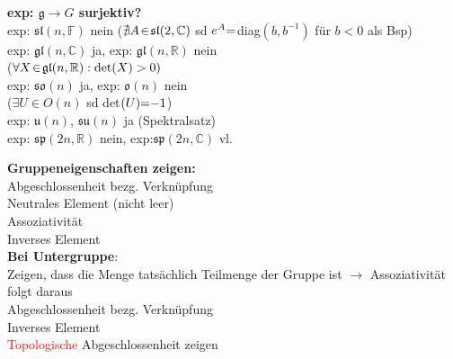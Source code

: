 \documentclass[8pt, a4paper, landscape]{extarticle}
\newcommand{\tit}[1]{\textbf{#1} \\}
\newcommand{\R}{\mathbb{R}}
\newcommand{\C}{\mathbb{C}}
\newcommand{\eq}{\negthickspace=\negthickspace}
\newcommand{\re}[1]{\textcolor{red}{#1}}
\newcommand{\eck}[1]{\mathfrak{#1}}
\begin{document}
\begin{multicols*}{5}
\begin{ibox}
\tit{exp: $\eck{g}\rightarrow G$ surjektiv?}
\textbullet exp: $\eck{sl}(n,\mathbb{F})$ nein ($\nexists A\negthinspace\in\negthinspace\eck{sl}(2,\C)$ sd $e^A\eq$ diag$(b,b^{-1})$ für $b<0$ als Bsp)\\
\textbullet exp: $\eck{gl}(n,\C)$ ja, exp: $\eck{gl}(n,\R)$ nein\\ ($\forall X\negthinspace\in\negthinspace\eck{gl}(n,\R): \text{det}(X)>0)$\\
\textbullet exp: $\eck{so}(n)$ ja, exp: $\eck{o}(n)$ nein \\($\exists U\in O(n)$ sd det$(U)\eq-1$)\\
\textbullet exp: $\eck{u}(n)$, $\eck{su}(n)$ ja (Spektralsatz)\\
\textbullet exp: $\eck{sp}(2n,\R)$ nein, exp:$\eck{sp}(2n,\C)$ vl.
\end{ibox}



\begin{ibox}
\tit{Gruppeneigenschaften zeigen:}
\textbullet Abgeschlossenheit bezg. Verknüpfung\\
\textbullet Neutrales Element (nicht leer)\\
\textbullet Assoziativität\\
\textbullet Inverses Element \\
\textbf{Bei Untergruppe}:\\
\textbullet Zeigen, dass die Menge tatsächlich Teilmenge der Gruppe ist $\rightarrow$ Assoziativität folgt daraus\\
\textbullet Abgeschlossenheit bezg. Verknüpfung\\
\textbullet Inverses Element \\
\textbullet \re{Topologische} Abgeschlossenheit zeigen
\end{ibox}

\end{multicols*}
\end{document}
